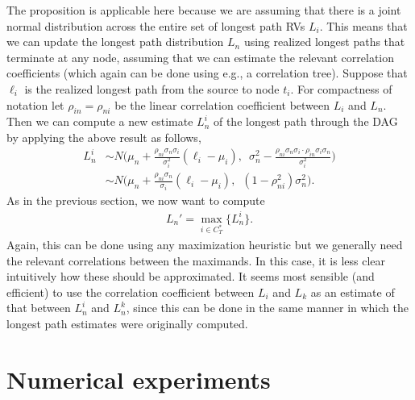 \documentclass[12pt]{article}
\begin{document}
The proposition is applicable here because we are assuming that there is a joint normal distribution across the entire set of longest path RVs $L_i$. This means that we can update the longest path distribution $L_n$ using realized longest paths that terminate at any node, assuming that we can estimate the relevant correlation coefficients (which again can be done using e.g., a correlation tree). Suppose that $\ell_i$ is the realized longest path from the source to node $t_i$. For compactness of notation let $\rho_{in} = \rho_{ni}$ be the linear correlation coefficient between $L_i$ and $L_n$. Then we can compute a new estimate $L_n^i$ of the longest path through the DAG by applying the above result as follows,
\begin{align*}
L_n^i &\sim N \bigg( \mu_{n} + \frac{\rho_{ni} \sigma_{n} \sigma_{i}}{\sigma_{i}^2} (\ell_i - \mu_{i}), \enspace \sigma_{n}^2 - \frac{\rho_{ni} \sigma_{n} \sigma_{i} \cdot \rho_{in} \sigma_{i} \sigma_{n}}{\sigma_{i}^2} \bigg) \nonumber\\
&\sim N \bigg(\mu_{n} + \frac{\rho_{ni} \sigma_{n}}{\sigma_{i}} (\ell_i - \mu_{i}), \enspace (1 - \rho_{ni}^2) \sigma_{n}^2 \bigg).
\end{align*}
As in the previous section, we now want to compute
\begin{align*}
  L_n' = \max_{i \in C_T^*} \{ L_n^i  \}.
\end{align*}
Again, this can be done using any maximization heuristic but we generally need the relevant correlations between the maximands. In this case, it is less clear intuitively how these should be approximated. It seems most sensible (and efficient) to use the correlation coefficient between $L_i$ and $L_k$ as an estimate of that between $L_n^i$ and $L_n^k$, since this can be done in the same manner in which the longest path estimates were originally computed.   


\section{Numerical experiments}
\label{sect.results}
\end{document}
